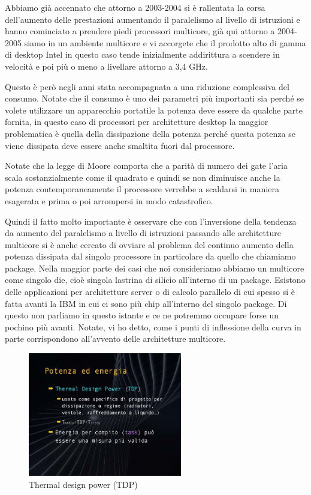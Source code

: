 Abbiamo già accennato che attorno a 2003-2004 si è rallentata la corsa dell'aumento delle prestazioni aumentando il paralelismo al livello di istruzioni e hanno cominciato a prendere piedi processori multicore, già qui attorno a 2004-2005 siamo in un ambiente multicore e vi accorgete che il prodotto alto di gamma di desktop Intel in questo caso tende inizialmente addirittura a scendere in velocità e poi più o meno a livellare attorno a 3,4 GHz.

Questo è però negli anni stata accompagnata a una riduzione complessiva del consumo.
Notate che il consumo è uno dei parametri più importanti sia perché se volete utilizzare un apparecchio portatile la potenza deve essere da qualche parte fornita, in questo caso di processori per architetture desktop la maggior problematica è quella della dissipazione della potenza perché questa potenza se viene dissipata deve essere anche smaltita fuori dal processore.

Notate che la legge di Moore comporta che a parità di numero dei gate l'aria scala sostanzialmente come il quadrato e quindi se non diminuisce anche la potenza contemporaneamente il processore verrebbe a scaldarsi in maniera esagerata e prima o poi arrompersi in modo catastrofico.

Quindi il fatto molto importante è osservare che con l'inversione della tendenza da aumento del paralelismo a livello di istruzioni passando alle architetture multicore si è anche cercato di ovviare al problema del continuo aumento della potenza dissipata dal singolo processore in particolare da quello che chiamiamo package.
Nella maggior parte dei casi che noi consideriamo abbiamo un multicore come singolo die, cioè singola lastrina di silicio all'interno di un package.
Esistono delle applicazioni per architetture server o di calcolo parallelo di cui spesso si è fatta avanti la IBM in cui ci sono più chip all'interno del singolo package.
Di questo non parliamo in questo istante e ce ne potremmo occupare forse un pochino più avanti.
Notate, vi ho detto, come i punti di inflessione della curva in parte corrispondono all'avvento delle architetture multicore.

\FloatBarrier
\begin{figure}[H]
  \centering
  \includegraphics[width=0.6\textwidth,
                    trim=50 110 45 100, %
                    clip]{images/Lez02_p01_fig_05.png}
  \caption{Thermal design power (TDP)}
  \label{fig:Lez02_p01_fig_05}
\end{figure}
\FloatBarrier
\noindent

